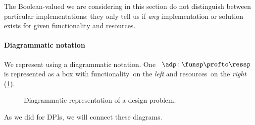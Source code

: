 The Boolean-valued  we are considering in this section do not distinguish between particular implementations: they only tell us if \emph{any} implementation or solution exists for given functionality and resources.


    \paragraph{Diagrammatic notation}
    We represent  using a diagrammatic notation.
    One ~$\adp \colon \funsp \profto \ressp$ is represented as a box with functionality~\funsp on the \emph{left} and resources~\ressp on the \emph{right} (\cref{fig:diagrammaticdp}).
    \begin{figure}[h!]
        \centering
        \caption{Diagrammatic representation of a design problem. }
        \label{fig:diagrammaticdp}
    \end{figure}

    As we did for DPIs, we will connect these diagrams.


\begin{marginfigure}
    \centering
    \caption{Diagram of the engine design problem.}
    \label{fig:enginedp}
\end{marginfigure}

